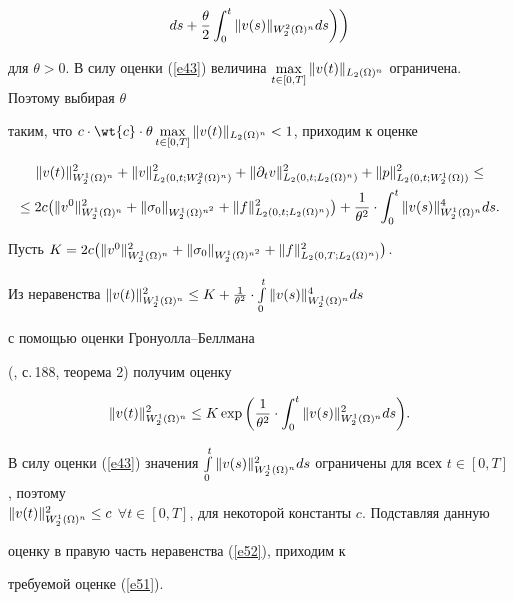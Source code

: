 \begin{pf}
\begin{multline*}
ds +\frac{\theta}{2}\intl 0 t \|v(s)\|_{W_2^2(\Om)^n} ds


\bigg)\bigg)


\end{multline*}


для $\theta>0$. В силу оценки (\ref{e43}) величина $\maxl {t \in


[0,T]}\|v(t)\|_{L_2(\Om)^n}$ ограничена. Поэтому выбирая $\theta$


таким, что $c \cdot \wt{c}\cdot \theta \maxl {t \in


[0,T]}\|v(t)\|_{L_2(\Om)^n} < 1$, приходим к оценке


\begin{multline}


\label{e52} 


\|v(t)\|_{W^1_2(\Om)^n}^2 +\|v\|_{L_2(0,t;W_2^2(\Om)^n)}^2 +


\|\partial_t v\|_{L_2(0,t;L_2(\Om)^n)}^2 


+\|p\|_{L_2(0,t;W_2^1(\Om))}^2 \le \\


%


\le 2 c \big(\|v^0\|_{W^1_2(\Om)^n}^2 +


\|\sig_0\|_{W^1_2(\Om)^{n^2}}


+\|f\|_{L_2(0,t;L_2(\Om)^n)}^2 \big) +


\frac{1}{{\theta}^2}\cdot \intl 0 t


\|v(s)\|_{W_2^1(\Om)^n}^4 ds.


\end{multline}





Пусть $K=2 c\big(\|v^0\|_{W^1_2(\Om)^n}^2 +


\|\sig_0\|_{W^1_2(\Om)^{n^2}}+\|f\|_{L_2(0,T;L_2(\Om)^n)}^2\big)$.


Из неравенства $\|v(t)\|_{W^1_2(\Om)^n}^2 \le K+


\frac{1}{{\theta}^2}\cdot \int\limits_0^t\|v(s)\|_{W_2^1(\Om)^n}^4 ds$


с помощью оценки Гронуолла--Беллмана


(\cite{BB}, с.\,188, теорема 2) получим оценку


$$


\|v(t)\|_{W^1_2(\Om)^n}^2 \le K\exp


\bigg({\frac{1}{{\theta}^2}\cdot \intl 0 t


\|v(s)\|_{W_2^1(\Om)^n}^2 ds}\bigg).


$$


В силу оценки (\ref{e43}) значения $\int\limits_0^t


\|v(s)\|_{W_2^1(\Om)^n}^2 ds $ ограничены для всех $t \in


[0,T]$, поэтому\\ $\|v(t)\|_{W^1_2(\Om)^n}^2\le c$ $\forall


t \in [0,T]$, для некоторой константы $c$. Подставляя данную


оценку в правую часть неравенства (\ref{e52}), приходим к


требуемой оценке (\ref{e51}).


\end{pf}
